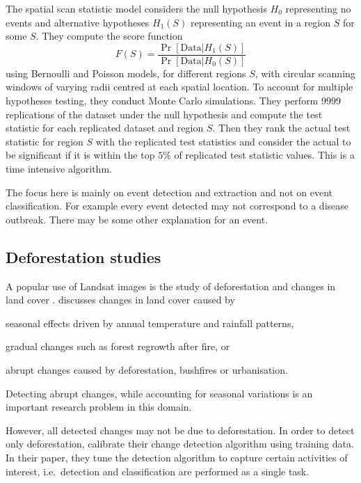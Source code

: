 \documentclass[a4paper,11pt]{article}
\begin{document}
The spatial scan statistic model \citep{kulldorff1997spatial} considers the null hypothesis $H_0$ representing no events and alternative hypotheses $H_1(S)$ representing an event in a region $S$ for some $S$. They compute the score function
\[
	F(S) = \frac{ \Pr[\text{Data}|H_1(S)]}{\Pr[\text{Data}|H_0(S)]}
\]
using Bernoulli and Poisson models, for different regions $S$, with circular scanning windows of varying radii centred at each spatial location. To account for multiple hypotheses testing, they conduct Monte Carlo simulations. They perform 9999 replications of the dataset under the null hypothesis and compute the test statistic for each replicated dataset and region $S$. Then they rank the actual test statistic for region $S$ with the replicated test statistics and consider the actual to be significant if it is within the top $5\%$ of replicated test statistic values. This is a time intensive algorithm.

The focus here is mainly on event detection and extraction and not on event classification. For example every event detected may not correspond to a disease outbreak. There may be some other explanation for an event.

\subsection{Deforestation studies}\label{subsec:Deforestation}

A popular use of Landsat images is the study of deforestation and changes in land cover \citep{verbesselt2010detecting}. \cite{verbesselt2012near} discusses changes in land cover caused by
\begin{inparaenum}
	\item seasonal effects driven by annual temperature and rainfall patterns,
	\item gradual changes such as forest regrowth after fire, or
	\item abrupt changes caused by deforestation, bushfires or urbanisation.
\end{inparaenum}
Detecting abrupt changes, while accounting for seasonal variations is an important research problem in this domain.

However, all detected changes may not be due to deforestation. In order to detect only deforestation, \cite{hamunyela2016using} calibrate their change detection algorithm using training data. In their paper, they tune the detection algorithm to capture certain activities of interest, i.e.\ detection and classification are performed as a single task.
\end{document}
